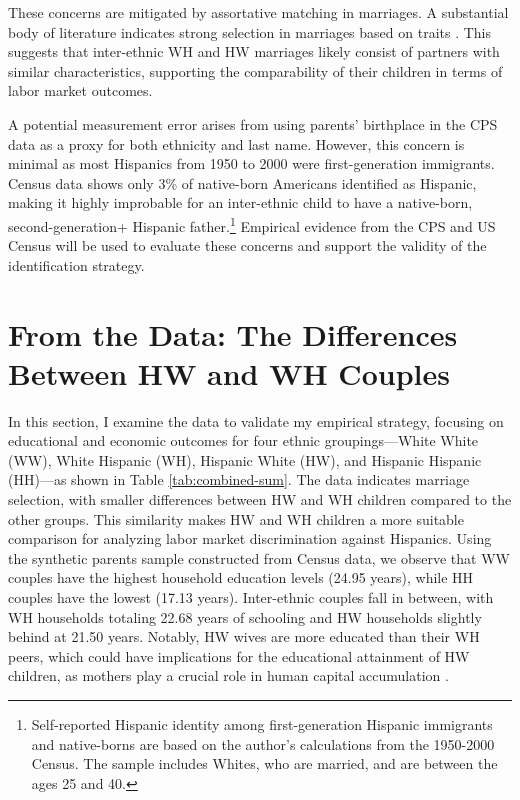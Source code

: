 \documentclass[a4paper,fleqn]{cas-sc}
\begin{document}
These concerns are mitigated by assortative matching in marriages. A substantial body of literature indicates strong selection in marriages based on traits \citep{averettBetterWorseRelationship2008, beckerTreatiseFamily1993,duncanIntermarriageIntergenerationalTransmission2011}. This suggests that inter-ethnic WH and HW marriages likely consist of partners with similar characteristics, supporting the comparability of their children in terms of labor market outcomes.

A potential measurement error arises from using parents' birthplace in the CPS data as a proxy for both ethnicity and last name. However, this concern is minimal as most Hispanics from 1950 to 2000 were first-generation immigrants. Census data shows only 3\% of native-born Americans identified as Hispanic, making it highly improbable for an inter-ethnic child to have a native-born, second-generation+ Hispanic father.\footnote{Self-reported Hispanic identity among first-generation Hispanic immigrants and native-borns are based on the author’s calculations from the 1950-2000 Census. The sample includes Whites, who are married, and are between the ages 25 and 40.} Empirical evidence from the CPS and US Census will be used to evaluate these concerns and support the validity of the identification strategy.

\section{From the Data: The Differences Between HW and WH Couples}\label{sec:hw-wh-couples-data}

In this section, I examine the data to validate my empirical strategy, focusing on educational and economic outcomes for four ethnic groupings—White White (WW), White Hispanic (WH), Hispanic White (HW), and Hispanic Hispanic (HH)—as shown in Table \ref{tab:combined-sum}. The data indicates marriage selection, with smaller differences between HW and WH children compared to the other groups. This similarity makes HW and WH children a more suitable comparison for analyzing labor market discrimination against Hispanics. Using the synthetic parents sample constructed from Census data, we observe that WW couples have the highest household education levels (24.95 years), while HH couples have the lowest (17.13 years). Inter-ethnic couples fall in between, with WH households totaling 22.68 years of schooling and HW households slightly behind at 21.50 years. Notably, HW wives are more educated than their WH peers, which could have implications for the educational attainment of HW children, as mothers play a crucial role in human capital accumulation \citep{kimball2009risk,magruder2010intergenerational}.
\end{document}
